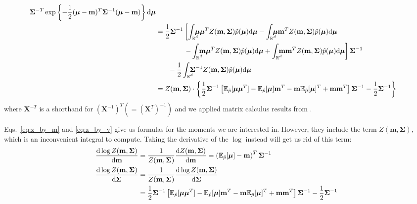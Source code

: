 \documentclass[11pt]{article}
\newcommand{\vek}[1]{\ensuremath{\mathbf{#1}}}
\newcommand{\byd}{\ensuremath{\mathrm{d}}}
\newcommand{\ee}{\ensuremath{\mathbb{E}}}
\newcommand{\real}{\ensuremath{\mathbb{R}}}
\newcommand{\intrc}{\ensuremath{\int_{\rlap{\scriptsize$\real^d$}}\:}}
\begin{document}
\begin{align}
					\vek{\Sigma}^{-T}
					\exp\left\{-\frac{1}{2}(\boldsymbol{\mu} - \vek{m})^T\vek{\Sigma}^{-1}
										 (\boldsymbol{\mu} - \vek{m})\right\}%
						\byd \boldsymbol{\mu}\\
		&= \frac{1}{2}\vek{\Sigma}^{-1}\left[
					\intrc\boldsymbol{\mu}\boldsymbol{\mu}^TZ(\vek{m}, \vek{\Sigma})\hat{p}(\boldsymbol{\mu})\byd\boldsymbol{\mu}
					- \intrc\boldsymbol{\mu}\vek{m}^T
							Z(\vek{m}, \vek{\Sigma})\hat{p}(\boldsymbol{\mu})\byd\boldsymbol{\mu}
			\right.\notag\\
		&\hphantom{= \frac{1}{2}\sigma^{-1}\left[\right.}\left.%
					- \intrc\vek{m}\boldsymbol{\mu}^T
							Z(\vek{m}, \vek{\Sigma})\hat{p}(\boldsymbol{\mu})\byd\boldsymbol{\mu}
					+ \intrc\vek{m}\vek{m}^T
							Z(\vek{m}, \vek{\Sigma})\hat{p}(\boldsymbol{\mu})\byd\boldsymbol{\mu}
				\right]\vek{\Sigma}^{-1}\notag\\
		&\hphantom{=\frac{1}{2}}%
			- \frac{1}{2}\intrc\vek{\Sigma}^{-1}
					Z(\vek{m}, \vek{\Sigma})\hat{p}(\boldsymbol{\mu})\byd\boldsymbol{\mu}\\
		&=Z(\vek{m}, \vek{\Sigma})\cdot\left\{\frac{1}{2}\vek{\Sigma}^{-1}\left[
				\ee_{\hat{p}}[\boldsymbol{\mu}\boldsymbol{\mu}^T]
				-\ee_{\hat{p}}[\boldsymbol{\mu}]\vek{m}^T
				-\vek{m}\ee_{\hat{p}}[\boldsymbol{\mu}]^T
				+\vek{m}\vek{m}^T      \right]\vek{\Sigma}^{-1}
			-\frac{1}{2}\vek{\Sigma}^{-1}\right\}
		\label{eq:z_by_v}
\end{align}
where $\vek{X}^{-T}$ is a shorthand for $\left(\vek{X}^{-1}\right)^T 
(=\left(\vek{X}^{T}\right)^{-1})$ and we applied matrix calculus results 
from \cite{mcalc}.

Eqs.~\eqref{eq:z_by_m} and \eqref{eq:z_by_v} give us formulas for the 
moments we are interested in.
However, they include the term $Z(\vek{m}, \vek{\Sigma}),$ which is an 
inconvenient integral to compute. Taking the derivative of the $\log$ 
instead will get us rid of this term:
\begin{align}
	\frac{\byd\log Z(\vek{m}, \vek{\Sigma})}{\byd\vek{m}} %
	&= \frac{1}{Z(\vek{m}, \vek{\Sigma})}\frac{\byd Z(\vek{m}, 
	\vek{\Sigma})}{\byd\vek{m}}
	= \left(\ee_{\hat{p}}[\boldsymbol{\mu}] - \vek{m}\right)^T\vek{\Sigma}^{-1}
	\label{eq:logz_by_m}\\
	\frac{\byd\log Z(\vek{m}, \vek{\Sigma})}{\byd \vek{\Sigma}} %
	&= \frac{1}{Z(\vek{m}, \vek{\Sigma})}\frac{\byd\log Z(\vek{m}, \vek{\Sigma})}{\byd 
	\vek{\Sigma}}\notag\\
	&=\frac{1}{2}\vek{\Sigma}^{-1}\left[
			\ee_{\hat{p}}[\boldsymbol{\mu}\boldsymbol{\mu}^T]
			-\ee_{\hat{p}}[\boldsymbol{\mu}]\vek{m}^T
			-\vek{m}\ee_{\hat{p}}[\boldsymbol{\mu}]^T
			+\vek{m}\vek{m}^T      \right]\vek{\Sigma}^{-1}
		-\frac{1}{2}\vek{\Sigma}^{-1}
	\label{eq:logz_by_v}
\end{align}
\end{document}
